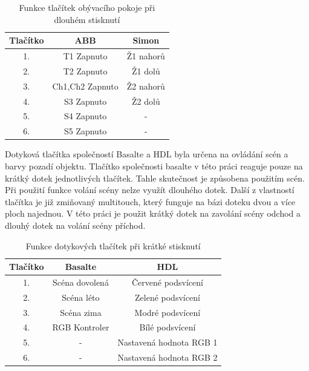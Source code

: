 \begin{table}[h]
 \caption[Funkce tlačítek obývacího pokoje při dlouhém stisknutí]{Funkce tlačítek obývacího pokoje při dlouhém stisknutí}
   \small
    \centering
	  \begin{tabular}{|c|c|c|}
	    \hline
	    Tlačítko & ABB & Simon  \\
	    \hline\hline
	    1. & T1 Zapnuto & Ž1 nahorů  \\
	    \hline
        2. & T2 Zapnuto & Ž1 dolů  \\
	    \hline
        3. & Ch1,Ch2 Zapnuto & Ž2 nahorů  \\
	    \hline
        4. & S3 Zapnuto & Ž2 dolů  \\
	    \hline
        5. & S4 Zapnuto & - \\
	    \hline 
        6. & S5 Zapnuto & - \\
	    \hline 
	  \end{tabular}
\end{table}

Dotyková tlačítka společností Basalte a HDL byla určena na ovládání scén a barvy pozadí objektu. Tlačítko společnosti basalte v této práci reaguje pouze na  krátký dotek jednotlivých tlačítek. Tahle skutečnost je způsobena použitím scén. Při použití funkce volání scény nelze využít dlouhého dotek. Další z vlastností tlačítka je již zmiňovaný multitouch, který funguje na bázi doteku dvou a více ploch najednou. V této práci je použit krátký dotek na zavolání scény odchod a dlouhý dotek na volání scény příchod.

\begin{table}[h]
 \caption[Funkce dotykových tlačítek při krátké stisknutí]{Funkce dotykových tlačítek při krátké stisknutí}
   \small
    \centering
	  \begin{tabular}{|c|c|c|}
	    \hline
	    Tlačítko & Basalte & HDL \\
	    \hline\hline
	    1. & Scéna dovolená  & Červené podsvícení \\
	    \hline
        2. & Scéna léto  &  Zelené podsvícení \\
	    \hline
        3. & Scéna zima  & Modré podsvícení   \\
	    \hline
        4. & RGB Kontroler & Bílé podsvícení \\
	    \hline
        5. & - & Nastavená hodnota RGB 1 \\
	    \hline 
        6. & - &  Nastavená hodnota RGB 2 \\
	    \hline 
	  \end{tabular}
\end{table}

